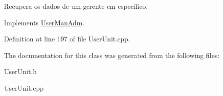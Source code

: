 Recupera os dados de um gerente em específico. 



Implements \hyperlink{classUserManAdm_a62e826d1c11061df021016e94e88f9ba}{User\-Man\-Adm}.



Definition at line 197 of file User\-Unit.\-cpp.



The documentation for this class was generated from the following files\-:\begin{DoxyCompactItemize}
\item 
User\-Unit.\-h\item 
User\-Unit.\-cpp\end{DoxyCompactItemize}
